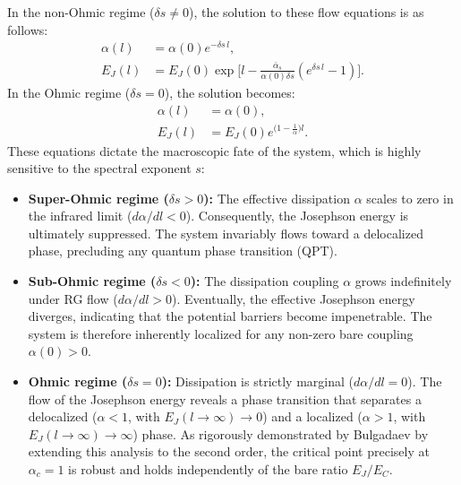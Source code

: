 \documentclass[aps,notitlepage,twocolumn,prl,nolongbibliography,superscriptaddress]{revtex4-2}
\begin{document}
In the non-Ohmic regime ($\delta s \neq 0$), the solution to these flow equations is as follows:
\begin{equation}
\begin{split}
    \alpha(l) &= \alpha(0)e^{-\delta s \, l},\\
    E_J(l) &= E_J(0) \exp \biggl[ l - \frac{\bar{\alpha}_s}{\alpha(0) \delta s} (e^{\delta s \, l} - 1) \biggr].
\end{split}
\end{equation}
In the Ohmic regime ($\delta s = 0$), the solution becomes:
\begin{equation}
\begin{split}
    \alpha(l) &= \alpha(0),\\
    E_J(l) &= E_J(0) e^{\bigl(1-\frac{1}{\alpha}\bigr)l}.
\end{split}
\end{equation}
These equations dictate the macroscopic fate of the system, which is highly sensitive to the spectral exponent $s$:
\begin{itemize}
    \item \textbf{Super-Ohmic regime ($\delta s > 0$):} The effective dissipation $\alpha$ scales to zero in the infrared limit ($d\alpha/dl < 0$). Consequently, the Josephson energy is ultimately suppressed. The system invariably flows toward a delocalized phase, precluding any quantum phase transition (QPT).
    \item \textbf{Sub-Ohmic regime ($\delta s < 0$):} The dissipation coupling $\alpha$ grows indefinitely under RG flow ($d\alpha/dl > 0$). Eventually, the effective Josephson energy diverges, indicating that the potential barriers become impenetrable. The system is therefore inherently localized for any non-zero bare coupling $\alpha(0) > 0$.
    \item \textbf{Ohmic regime ($\delta s = 0$):} Dissipation is strictly marginal ($d\alpha/dl = 0$). The flow of the Josephson energy reveals a phase transition that separates a delocalized ($\alpha < 1$, with $E_J(l\to \infty) \to 0$) and a localized ($\alpha > 1$, with $E_J(l\to \infty) \to \infty$) phase. As rigorously demonstrated by Bulgadaev \cite{Bulgadaev} by extending this analysis to the second order, the critical point precisely at $\alpha_c = 1$ is robust and holds independently of the bare ratio $E_J/E_C$.
\end{itemize}
\end{document}
